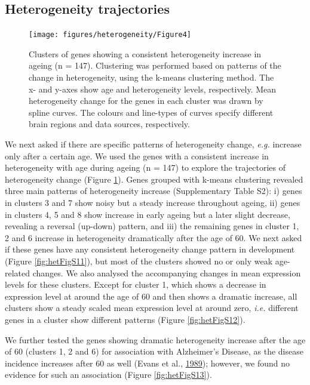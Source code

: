 \documentclass[12pt,twoside]{unicam}
\begin{document}
\hypertarget{heterogeneity-trajectories}{%
\subsection{Heterogeneity trajectories}\label{heterogeneity-trajectories}}

\begin{figure}

{\centering \texttt{[image: figures/heterogeneity/Figure4]} 

}

\caption[Clusters of genes showing a consistent heterogeneity increase in ageing]{Clusters of genes showing a consistent heterogeneity increase in ageing (n = 147). Clustering was performed based on patterns of the change in heterogeneity, using the k-means clustering method. The x- and y-axes show age and heterogeneity levels, respectively. Mean heterogeneity change for the genes in each cluster was drawn by spline curves. The colours and line-types of curves specify different brain regions and data sources, respectively.}\label{fig:hetFig4}
\end{figure}

We next asked if there are specific patterns of heterogeneity change, \emph{e.g.} increase only after a certain age. We used the genes with a consistent increase in heterogeneity with age during ageing (n = 147) to explore the trajectories of heterogeneity change (Figure \ref{fig:hetFig4}). Genes grouped with k-means clustering revealed three main patterns of heterogeneity increase (Supplementary Table S2): i) genes in clusters 3 and 7 show noisy but a steady increase throughout ageing, ii) genes in clusters 4, 5 and 8 show increase in early ageing but a later slight decrease, revealing a reversal (up-down) pattern, and iii) the remaining genes in cluster 1, 2 and 6 increase in heterogeneity dramatically after the age of 60. We next asked if these genes have any consistent heterogeneity change pattern in development (Figure \ref{fig:hetFigS11}), but most of the clusters showed no or only weak age-related changes. We also analysed the accompanying changes in mean expression levels for these clusters. Except for cluster 1, which shows a decrease in expression level at around the age of 60 and then shows a dramatic increase, all clusters show a steady scaled mean expression level at around zero, \emph{i.e.} different genes in a cluster show different patterns (Figure \ref{fig:hetFigS12}).

We further tested the genes showing dramatic heterogeneity increase after the age of 60 (clusters 1, 2 and 6) for association with Alzheimer's Disease, as the disease incidence increases after 60 as well (Evans et al., \protect\hyperlink{ref-Evans1989}{1989}); however, we found no evidence for such an association (Figure \ref{fig:hetFigS13}).
\end{document}
